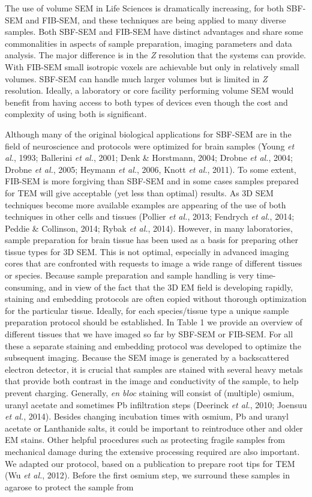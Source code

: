 \documentclass{article}
\begin{document}
The use of volume SEM in Life Sciences is dramatically increasing, for both SBF-SEM and FIB-SEM, and these techniques are being applied to many diverse samples. Both SBF-SEM and FIB-SEM have distinct advantages and share some commonalities in aspects of sample preparation, imaging parameters and data analysis. The major difference is in the \textit{Z} resolution that the systems can provide. With FIB-SEM small isotropic voxels are achievable but only in relatively small volumes. SBF-SEM can handle much larger volumes but is limited in \textit{Z} resolution. Ideally, a laboratory or core facility performing volume SEM would benefit from having access to both types of devices even though the cost and complexity of using both is significant.

Although many of the original biological applications for SBF-SEM are in the field of neuroscience and protocols were optimized for brain samples (Young \textit{et al.}, 1993; Ballerini \textit{et al.}, 2001; Denk \& Horstmann, 2004; Drobne \textit{et al.}, 2004; Drobne \textit{et al.}, 2005; Heymann \textit{et al.}, 2006, Knott \textit{et al.}, 2011). To some extent, FIB-SEM is more forgiving than SBF-SEM and in some cases samples prepared for TEM will give acceptable (yet less than optimal) results. As 3D SEM techniques become more available examples are appearing of the use of both techniques in other cells and tissues (Pollier \textit{et al.}, 2013; Fendrych \textit{et al.}, 2014; Peddie \& Collinson, 2014; Rybak \textit{et al.}, 2014). However, in many laboratories, sample preparation for brain tissue has been used as a basis for preparing other tissue types for 3D SEM. This is not optimal, especially in advanced imaging cores that are confronted with requests to image a wide range of different tissues or species. Because sample preparation and sample handling is very time-consuming, and in view of the fact that the 3D EM field is developing rapidly, staining and embedding protocols are often copied without thorough optimization for the particular tissue. Ideally, for each species/tissue type a unique sample preparation protocol should be established. In Table 1 we provide an overview of different tissues that we have imaged so far by SBF-SEM or FIB-SEM. For all these a separate staining and embedding protocol was developed to optimize the subsequent imaging. Because the SEM image is generated by a backscattered electron detector, it is crucial that samples are stained with several heavy metals that provide both contrast in the image and conductivity of the sample, to help prevent charging. Generally, \textit{en bloc} staining will consist of (multiple) osmium, uranyl acetate and sometimes Pb infiltration steps (Deerinck \textit{et al.}, 2010; Joensuu \textit{et al.}, 2014). Besides changing incubation times with osmium, Pb and uranyl acetate or Lanthanide salts, it could be important to reintroduce other and older EM stains. Other helpful procedures such as protecting fragile samples from mechanical damage during the extensive processing required are also important. We adapted our protocol, based on a publication to prepare root tips for TEM (Wu \textit{et al.}, 2012). Before the first osmium step, we surround these samples in agarose to protect the sample from 
\end{document}
